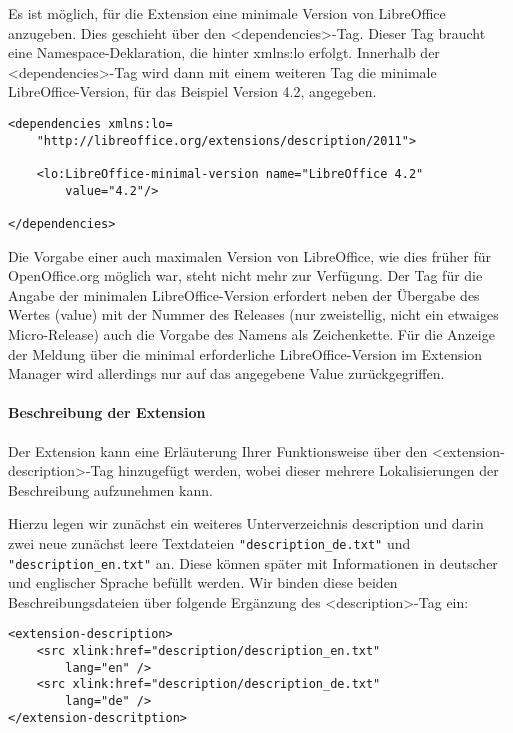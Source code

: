 \documentclass[a4paper,10pt,pagesize,titlepage]{scrbook}
\begin{document}
Es ist möglich, für die Extension eine minimale Version von LibreOffice anzugeben. Dies geschieht über den <dependencies>-Tag. Dieser Tag braucht eine Namespace-Deklaration, die hinter \glqq xmlns:lo\grqq{} erfolgt. Innerhalb der <dependencies>-Tag wird dann mit einem weiteren Tag die minimale LibreOffice-Version, für das Beispiel Version 4.2, angegeben.

\begin{lstlisting}
<dependencies xmlns:lo=
    "http://libreoffice.org/extensions/description/2011">
    
    <lo:LibreOffice-minimal-version name="LibreOffice 4.2" 
        value="4.2"/>
    
</dependencies>
\end{lstlisting}

Die Vorgabe einer auch maximalen Version von LibreOffice, wie dies früher für \mbox{OpenOffice.org} möglich war, steht nicht mehr zur Verfügung. Der Tag für die Angabe der minimalen LibreOffice-Version erfordert neben der Übergabe des Wertes (\glqq value\grqq ) mit der Nummer des Releases (nur zweistellig, nicht ein etwaiges Micro-Release) auch die Vorgabe des Namens als Zeichenkette. Für die Anzeige der Meldung über die minimal erforderliche LibreOffice-Version im Extension Manager wird allerdings nur auf das angegebene Value zurückgegriffen.

\paragraph*{Beschreibung der Extension}$~~$\\

Der Extension kann eine Erläuterung Ihrer Funktionsweise über den <extension-description>-Tag hinzugefügt werden, wobei dieser mehrere Lokalisierungen der Beschreibung aufzunehmen kann.

Hierzu legen wir zunächst ein weiteres Unterverzeichnis \glqq description\grqq{} und darin zwei neue zunächst leere Textdateien \verb|"description_de.txt"| und \verb|"description_en.txt"| an. Diese können später mit Informationen in deutscher und englischer Sprache befüllt werden. Wir binden diese beiden Beschreibungsdateien über folgende Ergänzung des <description>-Tag ein:
\begin{lstlisting}
<extension-description>
    <src xlink:href="description/description_en.txt" 
        lang="en" />
    <src xlink:href="description/description_de.txt" 
        lang="de" />
</extension-descritption>
\end{lstlisting}
\end{document}
